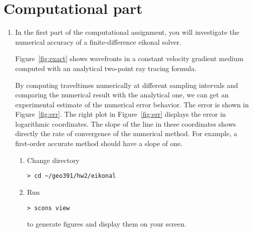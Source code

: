 \section{Computational part}

\lstset{language=python,numbers=left,numberstyle=\tiny,showstringspaces=false}

\begin{enumerate}

\item In the first part of the computational assignment, you will
  investigate the numerical accuracy of a finite-difference eikonal solver.

  {\small
    
  }

  Figure~\ref{fig:exact} shows wavefronts in a constant velocity
  gradient medium computed with an analytical two-point ray tracing
  formula.
 

  By computing traveltimes numerically at different sampling intervals
  and comparing the numerical result with the analytical one, we can
  get an experimental estimate of the numerical error behavior. The
  error is shown in Figure~\ref{fig:err}. The right plot in
  Figure~\ref{fig:err} displays the error in logarithmic coordinates. The
  slope of the line in these coordinates shows directly the rate of
  convergence of the numerical method. For example, a first-order
  accurate method should have a slope of one.


  \begin{enumerate}
  \item Change directory
\begin{verbatim}
> cd ~/geo391/hw2/eikonal
\end{verbatim}
  \item Run
\begin{verbatim}
> scons view
\end{verbatim}
    to generate figures and display them on your screen.  


\end{enumerate}
\end{enumerate}
